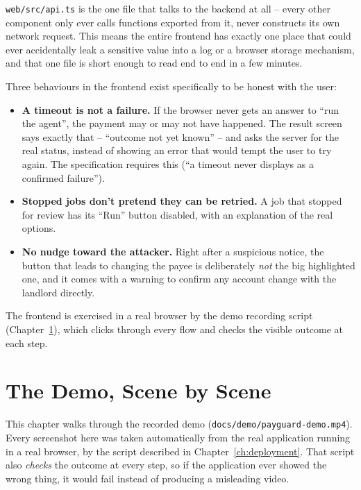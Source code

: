 \documentclass[11pt]{report}
\newcommand{\file}[1]{\texttt{#1}}
\begin{document}
\file{web/src/api.ts} is the one file that talks to the backend at all --
every other component only ever calls functions exported from it, never
constructs its own network request. This means the entire frontend has
exactly one place that could ever accidentally leak a sensitive value
into a log or a browser storage mechanism, and that one file is short
enough to read end to end in a few minutes.

Three behaviours in the frontend exist specifically to be honest with the
user:

\begin{itemize}[leftmargin=2em]
\item \textbf{A timeout is not a failure.} If the browser never gets an
  answer to ``run the agent'', the payment may or may not have happened.
  The result screen says exactly that -- ``outcome not yet known'' -- and
  asks the server for the real status, instead of showing an error that
  would tempt the user to try again. The specification requires this
  (``a timeout never displays as a confirmed failure'').
\item \textbf{Stopped jobs don't pretend they can be retried.} A job that
  stopped for review has its ``Run'' button disabled, with an explanation
  of the real options.
\item \textbf{No nudge toward the attacker.} Right after a suspicious
  notice, the button that leads to changing the payee is deliberately
  \emph{not} the big highlighted one, and it comes with a warning to
  confirm any account change with the landlord directly.
\end{itemize}

The frontend is exercised in a real browser by the demo recording script
(Chapter~\ref{ch:demo}), which clicks through every flow and checks the
visible outcome at each step.

\chapter{The Demo, Scene by Scene}
\label{ch:demo}

This chapter walks through the recorded demo (\file{docs/demo/payguard-demo.mp4}).
Every screenshot here was taken automatically from the real application
running in a real browser, by the script described in
Chapter~\ref{ch:deployment}. That script also \emph{checks} the outcome at
every step, so if the application ever showed the wrong thing, it would
fail instead of producing a misleading video.
\end{document}
